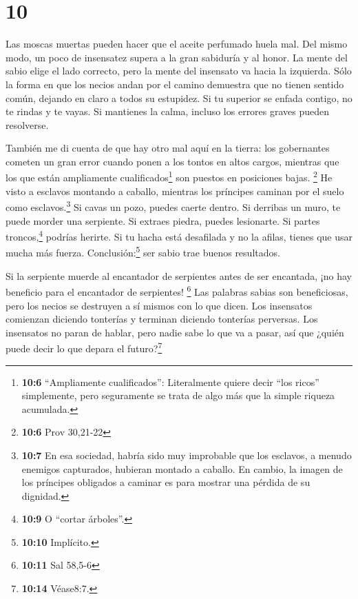 \hypertarget{section-9}{%
\section{10}\label{section-9}}

 Las moscas muertas pueden hacer que el aceite perfumado
huela mal. Del mismo modo, un poco de insensatez supera a la gran
sabiduría y al honor.  La mente del sabio elige el lado
correcto, pero la mente del insensato va hacia la izquierda.
 Sólo la forma en que los necios andan por el camino
demuestra que no tienen sentido común, dejando en claro a todos su
estupidez.  Si tu superior se enfada contigo, no te rindas
y te vayas. Si mantienes la calma, incluso los errores graves pueden
resolverse.

 También me di cuenta de que hay otro mal aquí en la
tierra: los gobernantes cometen un gran error  cuando
ponen a los tontos en altos cargos, mientras que los que están
ampliamente cualificados\footnote{\textbf{10:6} ``Ampliamente
  cualificados'': Literalmente quiere decir ``los ricos'' simplemente,
  pero seguramente se trata de algo más que la simple riqueza acumulada.}
son puestos en posiciones bajas. \footnote{\textbf{10:6} Prov 30,21-22}
 He visto a esclavos montando a caballo, mientras los
príncipes caminan por el suelo como esclavos.\footnote{\textbf{10:7} En
  esa sociedad, habría sido muy improbable que los esclavos, a menudo
  enemigos capturados, hubieran montado a caballo. En cambio, la imagen
  de los príncipes obligados a caminar es para mostrar una pérdida de su
  dignidad.}  Si cavas un pozo, puedes caerte dentro. Si
derribas un muro, te puede morder una serpiente.  Si
extraes piedra, puedes lesionarte. Si partes troncos,\footnote{\textbf{10:9}
  O ``cortar árboles''.} podrías herirte.  Si tu hacha
está desafilada y no la afilas, tienes que usar mucha más fuerza.
Conclusión:\footnote{\textbf{10:10} Implícito.} ser sabio trae buenos
resultados.

 Si la serpiente muerde al encantador de serpientes antes
de ser encantada, ¡no hay beneficio para el encantador de serpientes!
\footnote{\textbf{10:11} Sal 58,5-6}  Las palabras sabias
son beneficiosas, pero los necios se destruyen a sí mismos con lo que
dicen.  Los insensatos comienzan diciendo tonterías y
terminan diciendo tonterías perversas.  Los insensatos no
paran de hablar, pero nadie sabe lo que va a pasar, así que ¿quién puede
decir lo que depara el futuro?\footnote{\textbf{10:14} Véase8:7.}


